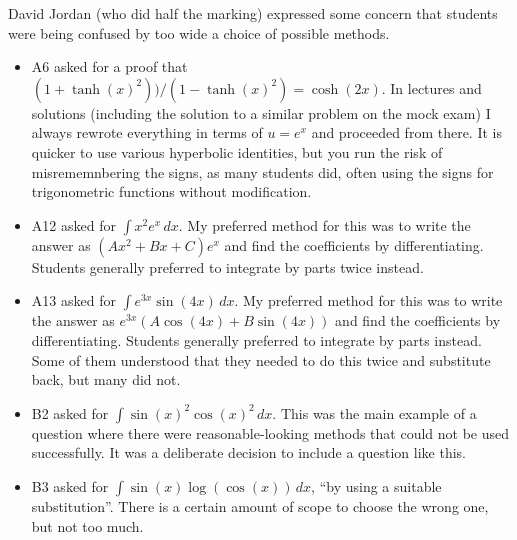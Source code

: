 \documentclass{amsart}
\begin{document}
David Jordan (who did half the marking) expressed some concern that
students were being confused by too wide a choice of possible methods.
\begin{itemize}
 \item A6 asked for a proof that
  $(1+\tanh(x)^2))/(1-\tanh(x)^2)=\cosh(2x)$.  In lectures and
  solutions (including the solution to a similar problem on the mock
  exam) I always rewrote everything in terms of $u=e^x$ and proceeded
  from there.  It is quicker to use various hyperbolic identities, but
  you run the risk of misrememnbering the signs, as many students
  did, often using the signs for trigonometric functions without
  modification. 
 \item A12 asked for $\int x^2e^x\,dx$.  My preferred method for this
  was to write the answer as $(Ax^2+Bx+C)e^x$ and find the
  coefficients by differentiating.  Students generally preferred to
  integrate by parts twice instead.
 \item A13 asked for $\int e^{3x}\sin(4x)\,dx$.  My preferred method for this
  was to write the answer as $e^{3x}(A\cos(4x)+B\sin(4x))$ and find the
  coefficients by differentiating.  Students generally preferred to
  integrate by parts instead.  Some of them understood that they
  needed to do this twice and substitute back, but many did not.
 \item B2 asked for $\int\sin(x)^2\cos(x)^2\,dx$.  This was the main
  example of a question where there were reasonable-looking methods
  that could not be used successfully.  It was a deliberate decision
  to include a question like this.
 \item B3 asked for $\int\sin(x)\log(\cos(x))\,dx$, ``by using a
  suitable substitution''.  There is a certain amount of scope to
  choose the wrong one, but not too much.
\end{itemize}
\end{document}
